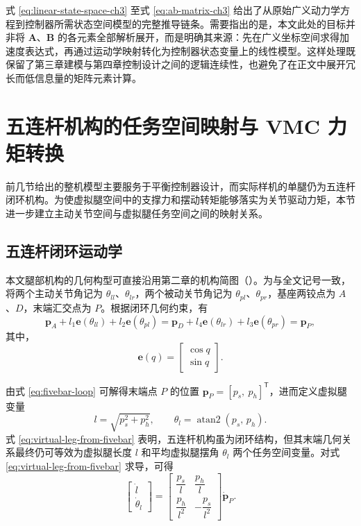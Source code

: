 式 \eqref{eq:linear-state-space-ch3} 至式 \eqref{eq:ab-matrix-ch3} 给出了从原始广义动力学方程到控制器所需状态空间模型的完整推导链条。需要指出的是，本文此处的目标并非将 $\boldsymbol{A}$、$\boldsymbol{B}$ 的各元素全部解析展开，而是明确其来源：先在广义坐标空间求得加速度表达式，再通过运动学映射转化为控制器状态变量上的线性模型。这样处理既保留了第三章建模与第四章控制设计之间的逻辑连续性，也避免了在正文中展开冗长而低信息量的矩阵元素计算。

\section{五连杆机构的任务空间映射与 VMC 力矩转换}

前几节给出的整机模型主要服务于平衡控制器设计，而实际样机的单腿仍为五连杆闭环机构。为使虚拟腿空间中的支撑力和摆动转矩能够落实为关节驱动力矩，本节进一步建立主动关节空间与虚拟腿任务空间之间的映射关系。

\subsection{五连杆闭环运动学}

本文腿部机构的几何构型可直接沿用第二章的机构简图（）。为与全文记号一致，将两个主动关节角记为 $\theta_{ll}$、$\theta_{lr}$，两个被动关节角记为 $\theta_{pl}$、$\theta_{pr}$，基座两铰点为 $A$、$D$，末端汇交点为 $P$。根据闭环几何约束，有
\begin{equation}
  \boldsymbol{p}_A + l_1 \boldsymbol{e}(\theta_{ll}) + l_2 \boldsymbol{e}(\theta_{pl})
  =
  \boldsymbol{p}_D + l_4 \boldsymbol{e}(\theta_{lr}) + l_3 \boldsymbol{e}(\theta_{pr})
  =
  \boldsymbol{p}_P,
  \label{eq:fivebar-loop}
\end{equation}
其中，
\begin{equation}
  \boldsymbol{e}(q) =
  \begin{bmatrix}
    \cos q \\
    \sin q
  \end{bmatrix}.
  \label{eq:unit-vector}
\end{equation}

由式 \eqref{eq:fivebar-loop} 可解得末端点 $P$ 的位置 $\boldsymbol{p}_P = [p_s,\ p_h]^\mathsf{T}$，进而定义虚拟腿变量
\begin{equation}
  l = \sqrt{p_s^2 + p_h^2},\qquad
  \theta_l = \operatorname{atan2}(p_s,\, p_h).
  \label{eq:virtual-leg-from-fivebar}
\end{equation}
式 \eqref{eq:virtual-leg-from-fivebar} 表明，五连杆机构虽为闭环结构，但其末端几何关系最终仍可等效为虚拟腿长度 $l$ 和平均虚拟腿摆角 $\theta_l$ 两个任务空间变量。对式 \eqref{eq:virtual-leg-from-fivebar} 求导，可得
\begin{equation}
  \begin{bmatrix}
    \dot{l} \\
    \dot{\theta}_l
  \end{bmatrix}
  =
  \begin{bmatrix}
    \dfrac{p_s}{l} & \dfrac{p_h}{l} \\
    \dfrac{p_h}{l^2} & -\dfrac{p_s}{l^2}
  \end{bmatrix}
  \dot{\boldsymbol{p}}_P.
  \label{eq:lp-theta-from-p}
\end{equation}

